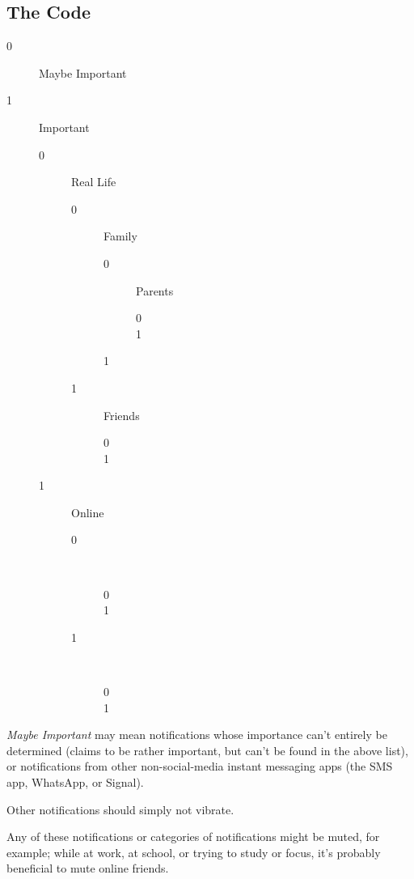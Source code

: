 \documentclass{article}
\begin{document}
\subsection{The Code}
\begin{description}
 \item[0] Maybe Important 
 \item[1] Important 
 \begin{description}
  \item[0] Real Life
  \begin{description}
   \item[0] Family
   \begin{description}
    \item[0] Parents
    \begin{description}
     \item[0]  
     \item[1]  
    \end{description}
    \item[1]  
   \end{description}
   \item[1] Friends
   \begin{description}
    \item[0]  
    \item[1]  
   \end{description}
  \end{description}
  \item[1] Online
  \begin{description}
   \item[0]~
   \begin{description}
    \item[0]  
    \item[1]  
   \end{description}
   \item[1]~
   \begin{description}
    \item[0]  
    \item[1]  
   \end{description}
  \end{description}
 \end{description}
\end{description}
\emph{Maybe Important} may mean notifications whose importance can't entirely be determined (\eg claims to be rather important, but can't be found in the above list), or notifications from other non-social-media instant messaging apps (the SMS app, WhatsApp, or Signal).

Other notifications should simply not vibrate.

Any of these notifications or categories of notifications might be muted, for example; while at work, at school, or trying to study or focus, it's probably beneficial to mute online friends.
\end{document}
